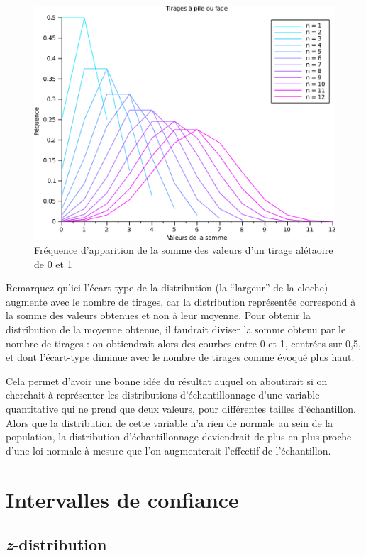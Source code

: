 \documentclass[
  french,
]{book}
\begin{document}
\begin{figure}
\centering
\includegraphics{images/tcl.png}
\caption{Fréquence d'apparition de la somme des valeurs d'un tirage alétaoire de 0 et 1}
\end{figure}

Remarquez qu'ici l'écart type de la distribution (la ``largeur'' de la cloche) augmente avec le nombre de tirages, car la distribution représentée correspond à la somme des valeurs obtenues et non à leur moyenne. Pour obtenir la distribution de la moyenne obtenue, il faudrait diviser la somme obtenu par le nombre de tirages : on obtiendrait alors des courbes entre 0 et 1, centrées sur 0,5, et dont l'écart-type diminue avec le nombre de tirages comme évoqué plus haut.

Cela permet d'avoir une bonne idée du résultat auquel on aboutirait si on cherchait à représenter les distributions d'échantillonnage d'une variable quantitative qui ne prend que deux valeurs, pour différentes tailles d'échantillon. Alors que la distribution de cette variable n'a rien de normale au sein de la population, la distribution d'échantillonnage deviendrait de plus en plus proche d'une loi normale à mesure que l'on augmenterait l'effectif de l'échantillon.

\hypertarget{intervalles-de-confiance}{%
\section{Intervalles de confiance}\label{intervalles-de-confiance}}

\hypertarget{z-distribution}{%
\subsection{\texorpdfstring{\emph{z}-distribution}{z-distribution}}\label{z-distribution}}
\end{document}
